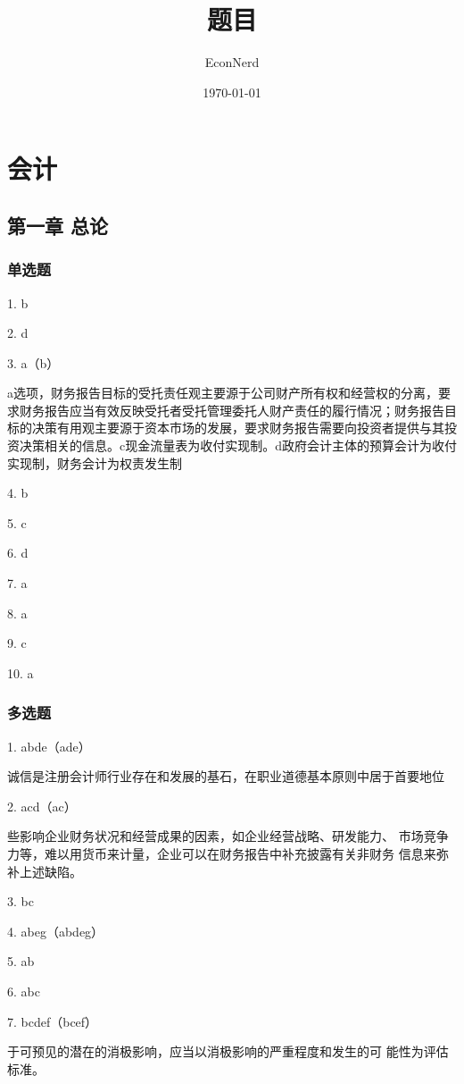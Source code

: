 \documentclass[UTF8,12pt]{ctexart}
\title{题目} %
\author{EconNerd}
\date{\today}
\numberwithin{equation}{section} %
\numberwithin{figure}{section}
\numberwithin{table}{section}
\begin{document}
	\maketitle
	\tableofcontents
	\newpage
	
	\section{会计}
	\subsection{第一章 总论}
	\subsubsection{单选题}
	1. b
	
	2. d
	
	3. a（b）
	
	a选项，财务报告目标的受托责任观主要源于公司财产所有权和经营权的分离，要求财务报告应当有效反映受托者受托管理委托人财产责任的履行情况；财务报告目标的决策有用观主要源于资本市场的发展，要求财务报告需要向投资者提供与其投资决策相关的信息。c现金流量表为收付实现制。d政府会计主体的预算会计为收付实现制，财务会计为权责发生制
	
	4. b
	
	5. c
	
	6. d
	
	7. a
	
	8. a
	
	9. c
	
	10. a
	
	\subsubsection{多选题}
	1. abde（ade）
	
	诚信是注册会计师行业存在和发展的基石，在职业道德基本原则中居于首要地位
	
	2. acd（ac）
	
	些影响企业财务状况和经营成果的因素，如企业经营战略、研发能力、
	市场竞争力等，难以用货币来计量，企业可以在财务报告中补充披露有关非财务
	信息来弥补上述缺陷。
	
	3. bc
	
	4. abeg（abdeg）
	
	5. ab
	
	6. abc
	
	7. bcdef（bcef）
	
	于可预见的潜在的消极影响，应当以消极影响的严重程度和发生的可
	能性为评估标准。
	
\end{document}
